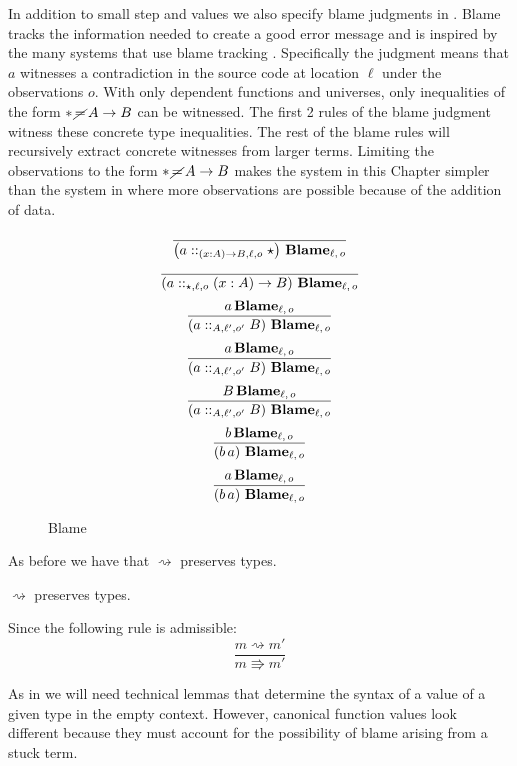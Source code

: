 In addition to small step and values we also specify blame judgments in .
Blame tracks the information needed to create a good error message and is inspired by the many systems that use blame tracking \cite{10.1145/581478.581484,10.1007/978-3-642-00590-9_1,wadler:LIPIcs:2015:5033}.
Specifically the judgment  means that $a$ witnesses a contradiction in the source code at location $\ell$ under the observations $o$.
With only dependent functions and universes, only inequalities of the form $*\,\cancel{=}\,A\rightarrow B$ can be witnessed.
The first 2 rules of the blame judgment witness these concrete type inequalities.
The rest of the blame rules will recursively extract concrete witnesses from larger terms.
Limiting the observations to the form $*\,\cancel{=}\,A\rightarrow B$ makes the system in this Chapter simpler than the system in  where more observations are possible because of the addition of data.
 
\begin{figure}
\[
\frac{\,}{\left(a::_{\left(x:A\right)\rightarrow B,\ell ,o}\star\right)\,\textbf{Blame}{}_{\ell,\,o}}
\]
\[
\frac{\,}{\left(a::_{\star,\ell ,o}\left(x:A\right)\rightarrow B\right)\,\textbf{Blame}{}_{\ell,\,o}}
\]
\[
\frac{
 a\,\textbf{Blame}{}_{\ell,\,o}
}{
 \left(a::_{A,\ell',o'}B\right)\,\textbf{Blame}{}_{\ell,\,o}
}
\]
\[
\frac{
 a\,\textbf{Blame}{}_{\ell,\,o}
}{
 \left(a::_{A,\ell',o'}B\right)\,\textbf{Blame}{}_{\ell,\,o}
}
\]
\[
\frac{
 B\,\textbf{Blame}{}_{\ell,\,o}
}{
 \left(a::_{A,\ell',o'}B\right)\,\textbf{Blame}{}_{\ell,\,o}
}
\]
\[
\frac{
 b\,\textbf{Blame}{}_{\ell,\,o}
}{
 \left(b\,a\right)\,\textbf{Blame}{}_{\ell,\,o}
}
\]
\[
\frac{
 a\,\textbf{Blame}{}_{\ell,\,o}
}{
 \left(b\,a\right)\,\textbf{Blame}{}_{\ell,\,o}
}
\]
\caption{\CLang{} Blame}
\label{fig:cast-blame}
\end{figure}
 
As before we have that $\rightsquigarrow$ preserves types.
 
\begin{fact} $\rightsquigarrow$ preserves types.
 
Since the following rule is admissible:
\[
\frac{m\rightsquigarrow m'}{m\Rrightarrow m'}
\]
\end{fact}
 
As in  we will need technical lemmas that determine the syntax of a value of a given type in the empty context.
However, canonical function values look different because they must account for the possibility of blame arising from a stuck term.

